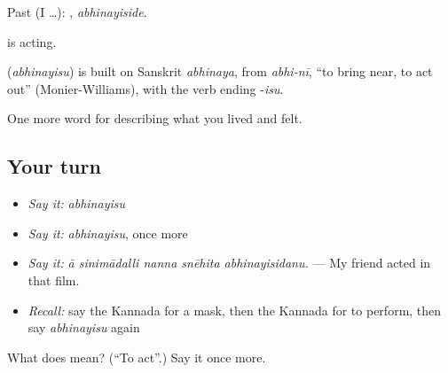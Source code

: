 Past (I …): , \emph{abhinayiside}.

 is acting.

\begin{cousinweb}
\textbf{} (\emph{abhinayisu}) is built on Sanskrit \emph{abhinaya}, from \emph{abhi-nī}, \textquotedblleft{}to bring near, to act out\textquotedblright{} (Monier-Williams), with the verb ending -\emph{isu}.
\end{cousinweb}

\begin{grammarlens}[title={What you've built}]
One more word for describing what you lived and felt.
\end{grammarlens}

\subsection*{Your turn}
\begin{itemize}
\raggedright
  \item \emph{Say it:} \emph{abhinayisu}
  \item \emph{Say it:} \emph{abhinayisu}, once more
  \item \emph{Say it:} \emph{ā sinimādalli nanna snēhita abhinayisidanu.} — My friend acted in that film.
  \item \emph{Recall:} say the Kannada for a mask, then the Kannada for to perform, then say \emph{abhinayisu} again
\end{itemize}

\begin{tcolorbox}[breakable,colback=teal!4,colframe=teal!35!black,title={Before you move on}]
What does  mean? (\textquotedblleft{}To act\textquotedblright{}.) Say it once more.
\end{tcolorbox}
